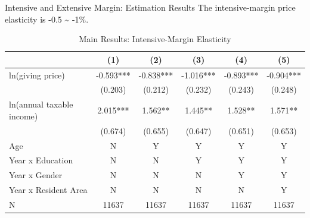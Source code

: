 \documentclass[
  ignorenonframetext,
]{beamer}
\begin{document}
\begin{frame}{Intensive and Extensive Margin: Estimation Results}
\protect\hypertarget{intensive-and-extensive-margin-estimation-results}{}
The intensive-margin price elasticity is -0.5 \textasciitilde{} -1\%.

\begin{table}

\caption{\label{tab:kableEstimateElasticityPart2Slide1}Main Results: Intensive-Margin Elasticity}
\centering
\fontsize{7}{9}\selectfont
\begin{tabular}[t]{lccccc}
\toprule
 & (1) & (2) & (3) & (4) & (5)\\
\midrule
ln(giving price) & -0.593*** & -0.838*** & -1.016*** & -0.893*** & -0.904***\\
 & (0.203) & (0.212) & (0.232) & (0.243) & (0.248)\\
ln(annual taxable income) & 2.015*** & 1.562** & 1.445** & 1.528** & 1.571**\\
 & (0.674) & (0.655) & (0.647) & (0.651) & (0.653)\\
Age & N & Y & Y & Y & Y\\
Year x Education & N & N & Y & Y & Y\\
Year x Gender & N & N & N & Y & Y\\
Year x Resident Area & N & N & N & N & Y\\
N & 11637 & 11637 & 11637 & 11637 & 11637\\
\bottomrule
\end{tabular}
\end{table}
\end{frame}
\end{document}
